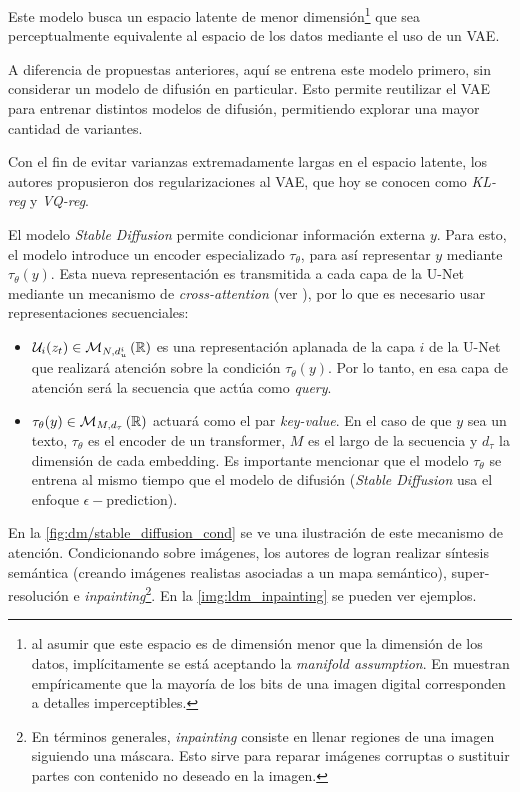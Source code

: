 Este modelo busca un espacio latente de menor dimensión\footnote{al asumir que este espacio es de dimensión menor que la dimensión de los datos, implícitamente se está aceptando la \textit{manifold assumption}. En \cite{rombach2022highresolution} muestran empíricamente que la mayoría de los bits de una imagen digital corresponden a detalles imperceptibles.} que sea perceptualmente equivalente al espacio de los datos mediante el uso de un VAE.

A diferencia de propuestas anteriores, aquí se entrena este modelo primero, sin considerar un modelo de difusión en particular. Esto permite reutilizar el VAE para entrenar distintos modelos de difusión, permitiendo explorar una mayor cantidad de variantes.

Con el fin de evitar varianzas extremadamente largas en el espacio latente, los autores propusieron dos regularizaciones al VAE, que hoy se conocen como \textit{KL-reg} y \textit{VQ-reg}.

El modelo \textit{Stable Diffusion} permite condicionar información externa $y$. Para esto, el modelo introduce un encoder especializado $\tau_\theta$, para así representar $y$ mediante $\tau_\theta(y)$. Esta nueva representación es transmitida a cada capa de la U-Net mediante un mecanismo de \textit{cross-attention} (ver \cite{vaswani2023attention}), por lo que es necesario usar representaciones secuenciales:

\begin{itemize}
    \item $\mathcal{U}_i(z_t)\in\mathcal{M}_{N,d_u^i}\left(\mathbb{R}\right)$ es una representación aplanada de la capa $i$ de la U-Net que realizará atención sobre la condición $\tau_\theta(y)$. Por lo tanto, en esa capa de atención será la secuencia que actúa como \textit{query}.
    \item $\tau_\theta(y)\in\mathcal{M}_{M,d_\tau}\left(\mathbb{R}\right)$ actuará como el par \textit{key-value}. En el caso de que $y$ sea un texto, $\tau_\theta$ es el encoder de un transformer, $M$ es el largo de la secuencia y $d_\tau$ la dimensión de cada embedding. Es importante mencionar que el modelo $\tau_\theta$ se entrena al mismo tiempo que el modelo de difusión (\textit{Stable Diffusion} usa el enfoque $\epsilon-$prediction).
\end{itemize}

En la \autoref{fig:dm/stable_diffusion_cond} se ve una ilustración de este mecanismo de atención. Condicionando sobre imágenes, los autores de \cite{rombach2022highresolution} logran realizar síntesis semántica (creando imágenes realistas asociadas a un mapa semántico), super-resolución  e \textit{inpainting}\footnote{En términos generales, \textit{inpainting} consiste en llenar regiones de una imagen siguiendo una máscara. Esto sirve para reparar imágenes corruptas o sustituir partes con contenido no deseado en la imagen.}. En la \autoref{img:ldm_inpainting} se pueden ver ejemplos.

